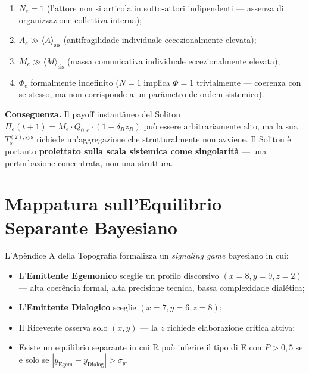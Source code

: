 \begin{enumerate}
\def\labelenumi{\arabic{enumi}.}
\tightlist
\item
  \(N_e = 1\) (l'attore non si articola in sotto-attori indipendenti ---
  assenza di organizzazione collettiva interna);
\item
  \(A_e \gg \langle A \rangle_{\text{sis}}\) (antifragilidade individuale
  eccezionalmente elevata);
\item
  \(M_e \gg \langle M \rangle_{\text{sis}}\) (massa comunicativa
  individuale eccezionalmente elevata);
\item
  \(\Phi_e\) formalmente indefinito (\(N=1\) implica \(\Phi = 1\)
  trivialmente --- coerenza con se stesso, ma non corrisponde a un
  parâmetro de ordem sistemico).
\end{enumerate}

\Proved{} \textbf{Conseguenza.} Il payoff instantâneo del Soliton
\(\Pi_e(t+1) = M_e \cdot Q_{0,e} \cdot (1 - \delta_R z_R)\) può essere
arbitrariamente alto, ma la sua \(T_s^{(2),\text{sys}}\) richiede
un'aggregazione che strutturalmente non avviene. Il Soliton è portanto
\textbf{proiettato sulla scala sistemica come singolarità} --- una
perturbazione concentrata, non una struttura.



\section{Mappatura sull'Equilibrio Separante
Bayesiano}\label{mappatura-sullequilibrio-separante-bayesiano}

L'Apêndice A della Topografia formalizza un \emph{signaling game}
bayesiano in cui:

\begin{itemize}
\tightlist
\item
  L'\textbf{Emittente Egemonico} sceglie un profilo discorsivo
  \((x = 8, y = 9, z = 2)\) --- alta coerência formal, alta precisione
  tecnica, bassa complexidade dialética;
\item
  L'\textbf{Emittente Dialogico} sceglie \((x = 7, y = 6, z = 8)\);
\item
  Il Ricevente osserva solo \((x, y)\) --- la \(z\) richiede
  elaborazione critica attiva;
\item
  Esiste un equilibrio separante in cui R può inferire il tipo di E con
  \(P > 0{,}5\) se e solo se
  \(|y_{\text{Egem}} - y_{\text{Dialog}}| > \sigma_y\).
\end{itemize}

